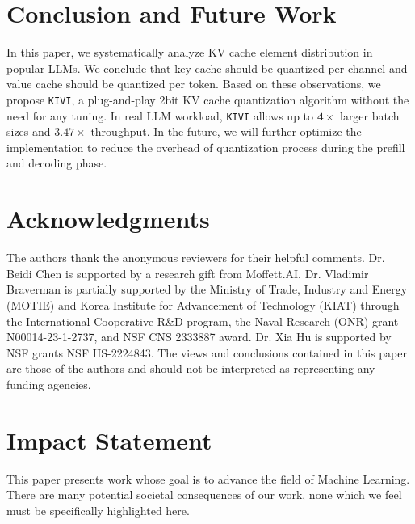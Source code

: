 \documentclass{article}
\theoremstyle{plain}
\theoremstyle{definition}
\theoremstyle{remark}
\newcommand{\kivi}[1]{\texttt{KIVI}}
\begin{document}






\section{Conclusion and Future Work}

In this paper, we systematically analyze KV cache element distribution in popular LLMs.
We conclude that key cache should be quantized per-channel and value cache should be quantized per token.
Based on these observations, we propose \kivi{}, a plug-and-play 2bit KV cache quantization algorithm without the need for any tuning. In real LLM workload, \kivi{} allows up to $\mathbf{4\times}$ larger batch sizes and $\mathbf{3.47\times}$ throughput. 
In the future, we will further optimize the implementation to reduce the overhead of quantization process during the prefill and decoding phase.

\section*{Acknowledgments}

The authors thank the anonymous reviewers for their helpful comments. 
Dr. Beidi Chen is supported by a research gift from Moffett.AI.
Dr. Vladimir Braverman is partially supported by the Ministry of Trade, Industry and Energy (MOTIE) and Korea Institute for Advancement of Technology (KIAT) through the International Cooperative R\&D program, the Naval Research (ONR) grant N00014-23-1-2737, and NSF CNS 2333887 award.
Dr. Xia Hu is supported by NSF grants NSF IIS-2224843. 
The views and conclusions contained in this paper are those of the authors and should not be interpreted as representing any funding agencies.


\section*{Impact Statement}

This paper presents work whose goal is to advance the field of Machine Learning. There are many potential societal consequences of our work, none which we feel must be specifically highlighted here.




\clearpage
\appendix

\end{document}
